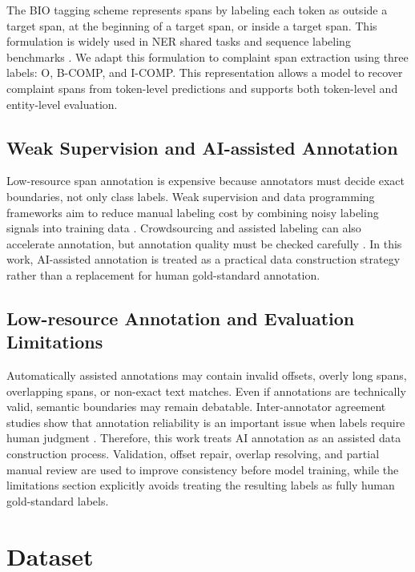 \documentclass[11pt]{article}
\begin{document}
The BIO tagging scheme represents spans by labeling each token as outside a target span, at the beginning of a target span, or inside a target span. This formulation is widely used in NER shared tasks and sequence labeling benchmarks \citep{conll2003ner,ratinov2009design}. We adapt this formulation to complaint span extraction using three labels: O, B-COMP, and I-COMP. This representation allows a model to recover complaint spans from token-level predictions and supports both token-level and entity-level evaluation.

\subsection{Weak Supervision and AI-assisted Annotation}

Low-resource span annotation is expensive because annotators must decide exact boundaries, not only class labels. Weak supervision and data programming frameworks aim to reduce manual labeling cost by combining noisy labeling signals into training data \citep{ratner2016data,ratner2017snorkel}. Crowdsourcing and assisted labeling can also accelerate annotation, but annotation quality must be checked carefully \citep{snow2008cheap,settles2009activelearning}. In this work, AI-assisted annotation is treated as a practical data construction strategy rather than a replacement for human gold-standard annotation.

\subsection{Low-resource Annotation and Evaluation Limitations}

Automatically assisted annotations may contain invalid offsets, overly long spans, overlapping spans, or non-exact text matches. Even if annotations are technically valid, semantic boundaries may remain debatable. Inter-annotator agreement studies show that annotation reliability is an important issue when labels require human judgment \citep{cohen1960kappa,artstein2008agreement}. Therefore, this work treats AI annotation as an assisted data construction process. Validation, offset repair, overlap resolving, and partial manual review are used to improve consistency before model training, while the limitations section explicitly avoids treating the resulting labels as fully human gold-standard labels.

\section{Dataset}
\end{document}
